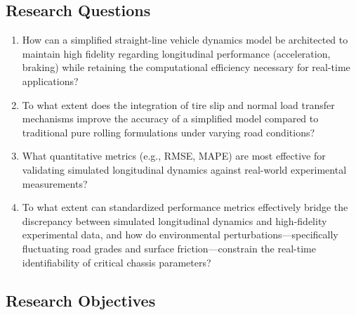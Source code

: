 \documentclass{article}
\begin{document}
\subsection{Research Questions}
\begin{enumerate}
\item 

How can a simplified straight-line vehicle dynamics model be architected to maintain high fidelity regarding longitudinal performance (acceleration, braking) while retaining the computational efficiency necessary for real-time applications?\item 

To what extent does the integration of tire slip and normal load transfer mechanisms improve the accuracy of a simplified model compared to traditional pure rolling formulations under varying road conditions?\item 

What quantitative metrics (e.g., RMSE, MAPE) are most effective for validating simulated longitudinal dynamics against real-world experimental measurements?\item 

To what extent can standardized performance metrics effectively bridge the discrepancy between simulated longitudinal dynamics and high-fidelity experimental data, and how do environmental perturbations—specifically fluctuating road grades and surface friction—constrain the real-time identifiability of critical chassis parameters?  \parencite{lorenzo_mosconi_2fca7202}
\end{enumerate}
\subsection{Research Objectives}
\end{document}
